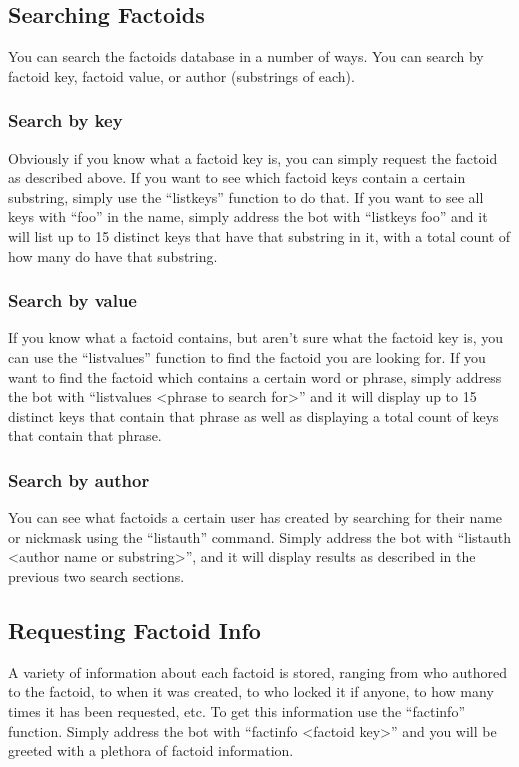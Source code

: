\documentclass[titlepage]{article}
\begin{document}
		\subsection{Searching Factoids}
			You can search the factoids database in a number of ways.  You can
			search by factoid key, factoid value, or author (substrings of
			each).
			
			\subsubsection{Search by key}
				Obviously if you know what a factoid key is, you can simply
				request the factoid as described above.  If you want to see
				which factoid keys contain a certain substring, simply use the
				``listkeys'' function to do that.  If you want to see all keys
				with ``foo'' in the name, simply address the bot with
				``listkeys foo'' and it will list up to 15 distinct keys that
				have that substring in it, with a total count of how many do
				have that substring.

			\subsubsection{Search by value}
				If you know what a factoid contains, but aren't sure what the
				factoid key is, you can use the ``listvalues'' function to
				find the factoid you are looking for.  If you want to find the
				factoid which contains a certain word or phrase, simply
				address the bot with ``listvalues <phrase to search for>'' and
				it will display up to 15 distinct keys that contain that
				phrase as well as displaying a total count of keys that
				contain that phrase.

			\subsubsection{Search by author}
				You can see what factoids a certain user has created by
				searching for their name or nickmask using the ``listauth''
				command.  Simply address the bot with ``listauth <author name
				or substring>'', and it will display results as described in
				the previous two search sections.

		\subsection{Requesting Factoid Info}
			A variety of information about each factoid is stored, ranging
			from who authored to the factoid, to when it was created, to who
			locked it if anyone, to how many times it has been requested, etc.
			To get this information use the ``factinfo'' function.  Simply
			address the bot with ``factinfo <factoid key>'' and you will be
			greeted with a plethora of factoid information.
		
\end{document}
